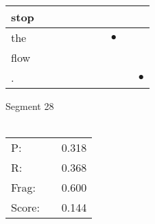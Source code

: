 \documentclass[landscape]{article}
\newcommand{\ssp}{\hspace{2pt}}
\newcommand{\mex}{\cellcolor{g}$\bullet$}
\begin{document}
\begin{tabular}{|l|p{10pt}|p{10pt}|p{10pt}|p{10pt}|p{10pt}|p{10pt}|p{10pt}|p{10pt}|p{10pt}|}
\hline
\ssp stop \ssp&\hspace{2pt}&\hspace{2pt}&\hspace{2pt}&\hspace{2pt}&\hspace{2pt}&\hspace{2pt}&\hspace{2pt}&\hspace{2pt}&\hspace{2pt}\\
\hline
\ssp \cellcolor{ref6}the \ssp&\hspace{2pt}&\hspace{2pt}&\hspace{2pt}&\hspace{2pt}&\hspace{2pt}&\hspace{2pt}&\hspace{2pt}\mex&\hspace{2pt}&\hspace{2pt}\\
\hline
\ssp flow \ssp&\hspace{2pt}&\hspace{2pt}&\hspace{2pt}&\hspace{2pt}&\hspace{2pt}&\hspace{2pt}&\hspace{2pt}&\hspace{2pt}&\hspace{2pt}\\
\hline
\ssp \cellcolor{ref8}. \ssp&\hspace{2pt}&\hspace{2pt}&\hspace{2pt}&\hspace{2pt}&\hspace{2pt}&\hspace{2pt}&\hspace{2pt}&\hspace{2pt}&\hspace{2pt}\mex\\
\hline
\end{tabular}

\vspace{6pt}
\noindent Segment 28\\\\
\noindent\begin{tabular}{lm{12pt}r}
\hline
P:&&0.318\\
R:&&0.368\\
Frag:&&0.600\\
Score:&&0.144\\
\end{tabular}
\end{document}
